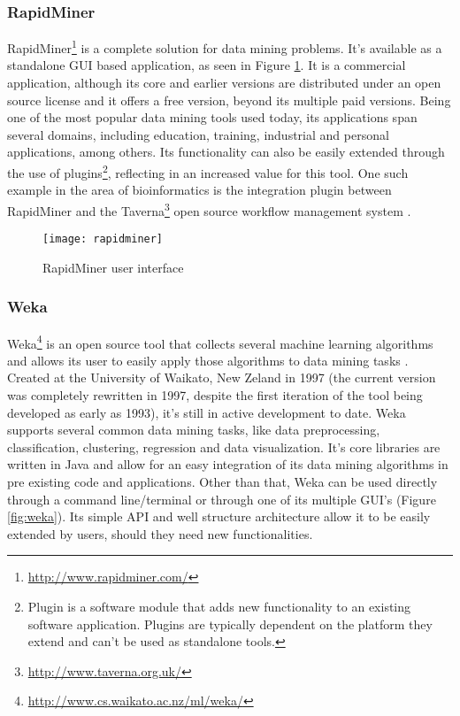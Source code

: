 \subsubsection*{RapidMiner}

RapidMiner\footnote{\url{http://www.rapidminer.com/}} is a complete solution for
data mining problems. It's available as a standalone GUI based application, as
seen in Figure \ref{fig:rapidminer}. It is a commercial application, although
its core and earlier versions are distributed under an open source license and
it offers a free version, beyond its multiple paid versions. Being one of the
most popular data mining tools used today, its applications span several
domains, including education, training, industrial and personal applications,
among others. Its functionality can also be easily extended through the use of
plugins\footnote{Plugin is a software module that adds new functionality to an
existing software application. Plugins are typically dependent on the platform
they extend and can't be used as standalone tools.}, reflecting in an increased
value for this tool. One such example in the area of bioinformatics is the
integration plugin between RapidMiner and the
Taverna\footnote{\url{http://www.taverna.org.uk/}} open source workflow
management system \cite{Jupp2011}.

\begin{figure}[!htb]
  \begin{center}
    \leavevmode
    \texttt{[image: rapidminer]}
    \caption{RapidMiner user interface}
    \label{fig:rapidminer}
  \end{center}
\end{figure}

\subsubsection*{Weka}

Weka\footnote{\url{http://www.cs.waikato.ac.nz/ml/weka/}} is an open source tool that
collects several machine learning algorithms and allows its user to easily apply
those algorithms to data mining tasks \cite{Hall}. Created at the University of
Waikato, New Zeland in 1997 (the current version was completely rewritten in
1997, despite the first iteration of the tool being developed as early as 1993),
it's still in active development to date. Weka supports several common data
mining tasks, like data preprocessing, classification, clustering, regression
and data visualization. It's core libraries are written in Java and allow for an
easy integration of its data mining algorithms in pre existing code and
applications. Other than that, Weka can be used directly through a command
line/terminal or through one of its multiple GUI's (Figure \ref{fig:weka}). Its
simple API and well structure architecture allow it to be easily extended by
users, should they need new functionalities.

